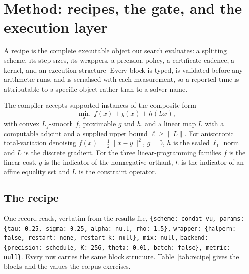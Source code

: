
\section{Method: recipes, the gate, and the execution layer}
\label{sec:methods}

A recipe is the complete executable object our search evaluates: a splitting
scheme, its step sizes, its wrappers, a precision policy, a certificate cadence,
a kernel, and an execution structure. Every block is typed, is validated before
any arithmetic runs, and is serialised with each measurement, so a reported time
is attributable to a specific object rather than to a solver name.

The compiler accepts supported instances of the composite form
\begin{equation}
  \min_{x}\; f(x) + g(x) + h(Lx),
  \label{eq:composite}
\end{equation}
with convex $L_f$-smooth $f$, proximable $g$ and $h$, and a linear map $L$ with a
computable adjoint and a supplied upper bound $\ell \geq \|L\|$. For anisotropic
total-variation denoising $f(x) = \tfrac12\|x-y\|^2$, $g = 0$, $h$ is the scaled
$\ell_1$ norm and $L$ is the discrete gradient. For the three linear-programming
families $f$ is the linear cost, $g$ is the indicator of the nonnegative orthant,
$h$ is the indicator of an affine equality set and $L$ is the constraint operator.

\subsection{The recipe}

One record reads, verbatim from the results file,
\verb!{scheme: condat_vu, params: {tau: 0.25, sigma: 0.25, alpha: null, rho: 1.5},!
\verb!wrapper: {halpern: false, restart: none, restart_k: null}, mix: null,!
\verb!backend: {precision: schedule, K: 256, theta: 0.01, batch: false}, metric: null}!.
Every row carries the same block structure. Table~\ref{tab:recipe} gives the
blocks and the values the corpus exercises.

